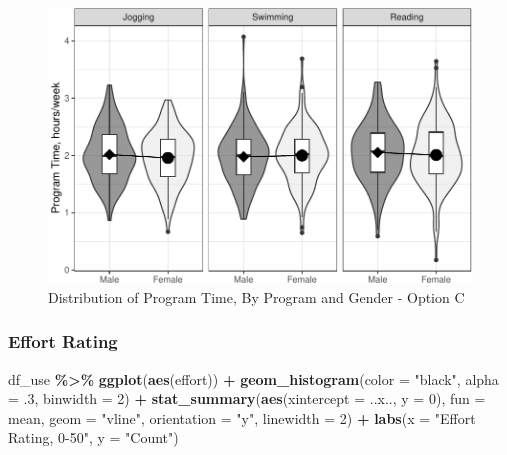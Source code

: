 \documentclass[
]{article}
\newenvironment{Shaded}{\begin{snugshade}}{\end{snugshade}}
\newcommand{\AttributeTok}[1]{\textcolor[rgb]{0.13,0.29,0.53}{#1}}
\newcommand{\DecValTok}[1]{\textcolor[rgb]{0.00,0.00,0.81}{#1}}
\newcommand{\FunctionTok}[1]{\textcolor[rgb]{0.13,0.29,0.53}{\textbf{#1}}}
\newcommand{\NormalTok}[1]{#1}
\newcommand{\SpecialCharTok}[1]{\textcolor[rgb]{0.81,0.36,0.00}{\textbf{#1}}}
\newcommand{\StringTok}[1]{\textcolor[rgb]{0.31,0.60,0.02}{#1}}
\begin{document}
\begin{figure}[hb]

\includegraphics{Appendix_ex_weightloss_files/figure-latex/unnamed-chunk-49-1} \hfill{}

\caption{Distribution of Program Time, By Program and Gender - Option C}\label{fig:unnamed-chunk-49}
\end{figure}

\clearpage

\hypertarget{effort-rating}{%
\subsubsection{Effort Rating}\label{effort-rating}}

\begin{Shaded}
\begin{Highlighting}[]
\NormalTok{df\_use }\SpecialCharTok{\%\textgreater{}\%} 
  \FunctionTok{ggplot}\NormalTok{(}\FunctionTok{aes}\NormalTok{(effort)) }\SpecialCharTok{+} 
  \FunctionTok{geom\_histogram}\NormalTok{(}\AttributeTok{color =} \StringTok{"black"}\NormalTok{,}
                 \AttributeTok{alpha =}\NormalTok{ .}\DecValTok{3}\NormalTok{,}
                 \AttributeTok{binwidth =} \DecValTok{2}\NormalTok{) }\SpecialCharTok{+}
  \FunctionTok{stat\_summary}\NormalTok{(}\FunctionTok{aes}\NormalTok{(}\AttributeTok{xintercept =}\NormalTok{ ..x.., }
                   \AttributeTok{y =} \DecValTok{0}\NormalTok{), }
               \AttributeTok{fun =}\NormalTok{ mean, }
               \AttributeTok{geom =} \StringTok{"vline"}\NormalTok{, }
               \AttributeTok{orientation =} \StringTok{"y"}\NormalTok{,}
               \AttributeTok{linewidth =} \DecValTok{2}\NormalTok{) }\SpecialCharTok{+}
  \FunctionTok{labs}\NormalTok{(}\AttributeTok{x =} \StringTok{"Effort Rating, 0{-}50"}\NormalTok{,}
       \AttributeTok{y =} \StringTok{"Count"}\NormalTok{)}
\end{Highlighting}
\end{Shaded}
\end{document}
